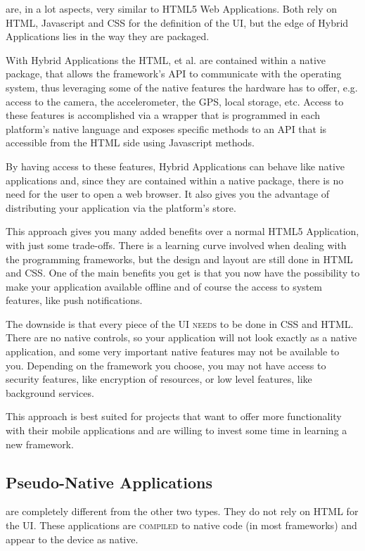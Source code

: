  are, in a lot aspects, very similar to HTML5 Web Applications. Both rely on HTML, Javascript and CSS for the definition of the \ac{UI}, but the edge of Hybrid Applications lies in the way they are packaged.

With Hybrid Applications the HTML, et al. are contained within a native package, that allows the framework's \ac{API} to communicate with the operating system, thus leveraging some of the native features the hardware has to offer, e.g. access to the camera, the accelerometer, the GPS, local storage, etc. Access to these features is accomplished via a wrapper that is programmed in each platform's native language and exposes specific methods to an \ac{API} that is accessible from the HTML side using Javascript methods.

By having access to these features, Hybrid Applications can behave like native applications and, since they are contained within a native package, there is no need for the user to open a web browser. It also gives you the advantage of distributing your application via the platform's store.

This approach gives you many added benefits over a normal HTML5 Application, with just some trade-offs. There is a learning curve involved when dealing with the programming frameworks, but the design and layout are still done in HTML and CSS. One of the main benefits you get is that you now have the possibility to make your application available offline and of course the access to system features, like push notifications. 

The downside is that every piece of the \ac{UI} \textsc{needs} to be done in CSS and HTML. There are no native controls, so your application will not look exactly as a native application, and some very important native features may not be available to you. Depending on the framework you choose, you may not have access to security features, like encryption of resources, or low level features, like background services.  

This approach is best suited for projects that want to offer more functionality with their mobile applications and are willing to invest some time in learning a new framework.  

\subsection{Pseudo-Native Applications}\label{sec:pseudo_app}
 are completely different from the other two types. They do not rely on HTML for the \ac{UI}. These applications are \textsc{compiled} to native code (in most frameworks) and appear to the device as native.


